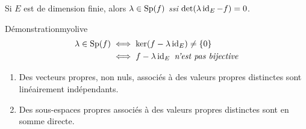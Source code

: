     \begin{prop}{}{}
        Si $E$ est de dimension finie, alors $\lambda \in \operatorname{Sp}(f)$ \textit{ssi} $\operatorname{det}(\lambda \operatorname{id}_E - f) = 0$.
    \end{prop}

    \begin{demo}{Démonstration}{myolive}
        \begin{align*}
            \lambda \in \operatorname{Sp}(f) 
            &\iff \ker(f - \lambda \operatorname{id}_E) \neq \{0\} \\
            &\iff f - \lambda \operatorname{id}_E \textit{ n’est pas bijective}
        \end{align*}
    \end{demo}

    \begin{prop}{}{}
        \begin{enumerate}
            \item Des vecteurs propres, non nuls, associés à des valeurs propres distinctes sont linéairement indépendants. 
            \item Des sous-espaces propres associés à des valeurs propres distinctes sont en somme directe.
        \end{enumerate}
    \end{prop}

